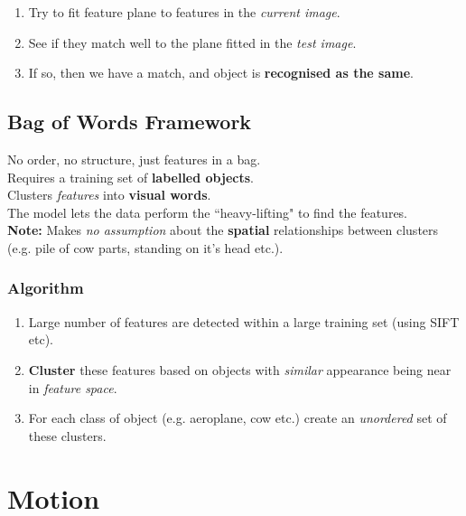 \documentclass[english, 10pt]{article}
\begin{document}
\begin{enumerate}
\item Try to fit feature plane to features in the \textit{current image}.
\item See if they match well to the plane fitted in the \textit{test image}.
\item If so, then we have a match, and object is \textbf{recognised as the same}. 
\end{enumerate}

\subsection{Bag of Words Framework}

No order, no structure, just features in a bag. \\

Requires a training set of \textbf{labelled objects}. \\

Clusters \textit{features} into \textbf{visual words}. \\

The model lets the data perform the ``heavy-lifting" to find the features. \\

\textbf{Note:} Makes \textit{no assumption} about the \textbf{spatial} relationships between clusters (e.g. pile of cow parts, standing on it's head etc.). \\

\subsubsection{Algorithm}

\begin{enumerate}
\item Large number of features are detected within a large training set (using SIFT etc).
\item \textbf{Cluster} these features based on objects with \textit{similar} appearance being near in \textit{feature space}.
\item For each class of object (e.g. aeroplane, cow etc.) create an \textit{unordered} set of these clusters.
\end{enumerate}


\section{Motion}\label{motion}
\end{document}
